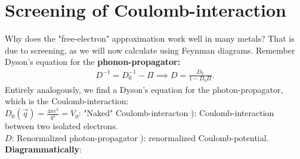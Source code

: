 \section{Screening of Coulomb-interaction}
Why does the "free-electron" approximation work well in many metals? That is due to screening, as we will now calculate using Feynman diagrams. Remember Dyson's equation for the \textbf{phonon-propagator:}
\begin{align}
\label{eq:DysonPhononPropagator}
D^{-1} = D_0^{-1} - \Pi \implies D = \frac{D_0}{1 - D_0 \Pi}.
\end{align}
Entirely analogously, we find a Dyson's equation for the photon-propagator, which is the Coulomb-interaction:\\
$D_0(\vec{q}) = \frac{4\pi e^2}{q^2} = V_0$: "Naked" Coulomb-interacton ): Coulomb-interaction between two isolated electrons.\\
$D$: Renormalized photon-propagator ): renormalized Coulomb-potential.\\
\textbf{Diagrammatically}:
